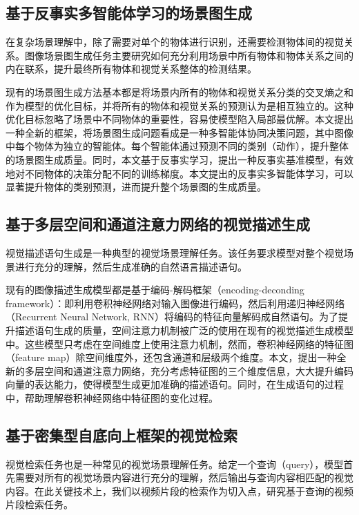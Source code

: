 \subsection{基于反事实多智能体学习的场景图生成}
在复杂场景理解中，除了需要对单个的物体进行识别，还需要检测物体间的视觉关系。图像场景图生成任务主要研究如何充分利用场景中所有物体和物体关系之间的内在联系，提升最终所有物体和视觉关系整体的检测结果。

现有的场景图生成方法基本都是将场景内所有的物体和视觉关系分类的交叉熵之和作为模型的优化目标，并将所有的物体和视觉关系的预测认为是相互独立的。这种优化目标忽略了场景中不同物体的重要性，容易使模型陷入局部最优解。本文提出一种全新的框架，将场景图生成问题看成是一种多智能体协同决策问题，其中图像中每个物体为独立的智能体。每个智能体通过预测不同的类别（动作），提升整体的场景图生成质量。同时，本文基于反事实学习，提出一种反事实基准模型，有效地对不同物体的决策分配不同的训练梯度。本文提出的反事实多智能体学习，可以显著提升物体的类别预测，进而提升整个场景图的生成质量。


\subsection{基于多层空间和通道注意力网络的视觉描述生成}

视觉描述语句生成是一种典型的视觉场景理解任务。该任务要求模型对整个视觉场景进行充分的理解，然后生成准确的自然语言描述语句。

现有的图像描述生成模型都是基于编码-解码框架（encoding-deconding framework）：即利用卷积神经网络对输入图像进行编码，然后利用递归神经网络（Recurrent Neural Network, RNN）将编码的特征向量解码成自然语句。为了提升描述语句生成的质量，空间注意力机制被广泛的使用在现有的视觉描述生成模型中。这些模型只考虑在空间维度上使用注意力机制，然而，卷积神经网络的特征图（feature map）除空间维度外，还包含通道和层级两个维度。本文，提出一种全新的多层空间和通道注意力网络，充分考虑特征图的三个维度信息，大大提升编码向量的表达能力，使得模型生成更加准确的描述语句。同时，在生成语句的过程中，帮助理解卷积神经网络中特征图的变化过程。

\subsection{基于密集型自底向上框架的视觉检索}

视觉检索任务也是一种常见的视觉场景理解任务。给定一个查询（query），模型首先需要对所有的视觉场景内容进行充分的理解，然后输出与查询内容相匹配的视觉内容。在此关键技术上，我们以视频片段的检索作为切入点，研究基于查询的视频片段检索任务。

